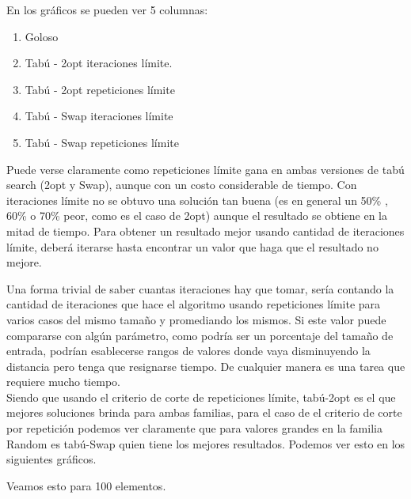 En los gráficos se pueden ver 5 columnas:

\begin{enumerate}
\item Goloso
\item Tabú - 2opt iteraciones límite.
\item Tabú - 2opt repeticiones límite
\item Tabú - Swap iteraciones límite
\item Tabú - Swap repeticiones límite
\end{enumerate}

Puede verse claramente como repeticiones límite gana en ambas versiones de tabú search (2opt y Swap), aunque con un costo considerable de tiempo. Con iteraciones límite no se obtuvo una solución tan buena (es en general un 50\% , 60\% o 70\% peor, como es el caso de 2opt) aunque el resultado se obtiene en la mitad de tiempo. Para obtener un resultado mejor usando cantidad de iteraciones límite, deberá iterarse hasta encontrar un valor que haga que el resultado no mejore. 

Una forma trivial de saber cuantas iteraciones hay que tomar, sería contando la cantidad de iteraciones que hace el algoritmo usando repeticiones límite para varios casos del mismo tamaño y promediando los mismos. Si este valor puede compararse con algún parámetro, como podría ser un porcentaje del tamaño de entrada, podrían esablecerse rangos de valores donde vaya disminuyendo la distancia pero tenga que resignarse tiempo. De cualquier manera es una tarea que requiere mucho tiempo.\\

Siendo que usando el criterio de corte de repeticiones límite, tabú-2opt es el que mejores soluciones brinda para ambas familias, para el caso de el criterio de corte por repetición podemos ver claramente que para valores grandes en la familia Random es tabú-Swap quien tiene los mejores resultados. Podemos ver esto en los siguientes gráficos.

Veamos esto para 100 elementos.\\

